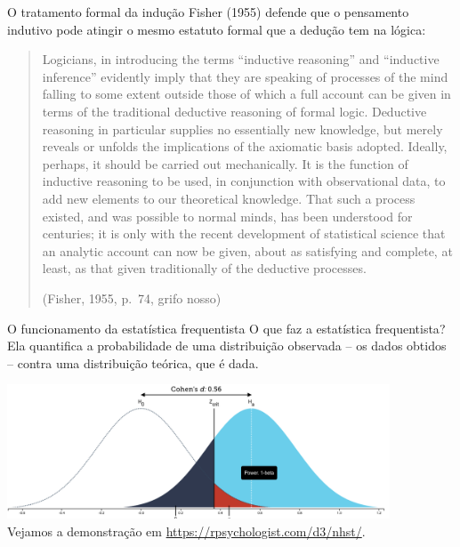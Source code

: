 \documentclass[numbering=fraction,aspectratio=169]{beamer}
\newcommand{\FigureCaption}[1]{{\scriptsize #1}}
\begin{document}
\begin{frame}{O tratamento formal da indução}
  Fisher (1955) defende que o pensamento indutivo pode atingir \alert{o mesmo estatuto formal} que a dedução tem na lógica:
  \medskip

  \begin{quote}
    \footnotesize
    Logicians, in introducing the terms “inductive reasoning” and “inductive inference” evidently imply that they are speaking of processes of the mind falling to some extent outside those of which a full account can be given in terms of the traditional deductive reasoning of formal logic. \pause
    Deductive reasoning in particular supplies no essentially new knowledge, but merely reveals or unfolds the implications of the axiomatic basis adopted. Ideally, perhaps, it should be carried out mechanically. \pause
    \alert{It is the function of inductive reasoning to be used, in conjunction with observational data, to add new elements to our theoretical knowledge.} \pause
    That such a process existed, and was possible to normal minds, has been understood for centuries; \alert{it is only with the recent development of statistical science that an analytic account can now be given, about as satisfying and complete, at least, as that given traditionally of the deductive processes}.

    \raggedleft
    (Fisher, 1955, p.~74, grifo nosso)
  \end{quote}
\end{frame}

\begin{frame}{O funcionamento da estatística frequentista}
  O que faz a \alert{estatística frequentista}? Ela quantifica a probabilidade de uma \alert{distribuição observada} -- os dados obtidos -- \alert{contra uma distribuição teórica, que é dada}.

  \centering
  \includegraphics[height=4cm]{img/nhst}\\
  \FigureCaption{Vejamos a demonstração em \url{https://rpsychologist.com/d3/nhst/}.}
\end{frame}
\end{document}
